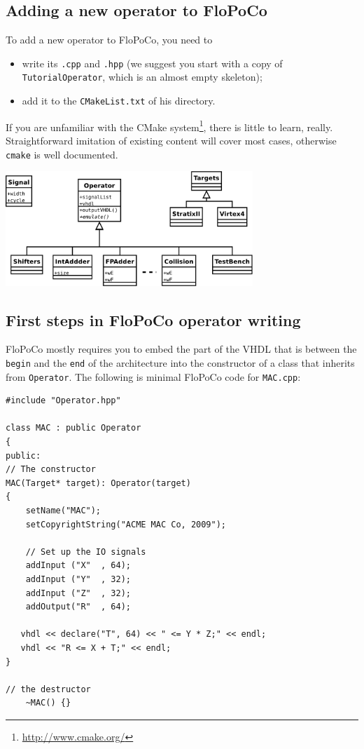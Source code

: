 \documentclass{article}
\begin{document}
\subsection{Adding a new operator to FloPoCo}
To add a new operator to FloPoCo, you need to 
\begin{itemize}
\item write its \texttt{.cpp} and \texttt{.hpp} (we suggest you start with a copy of  \texttt{TutorialOperator}, which is an almost empty skeleton);
\item add it to the \texttt{CMakeList.txt} of his directory.
\end{itemize}
If you are unfamiliar with the CMake system\footnote{\url{http://www.cmake.org/}}, there is little to learn, really.
Straightforward imitation of existing content  will cover most cases, otherwise \texttt{cmake} is well documented.



\begin{center}
  \includegraphics[width=0.7\textwidth]{../Figures/FloPoCoClasses.pdf}        
\end{center}

\subsection{First steps in FloPoCo operator writing}

FloPoCo mostly requires you to embed the part of the VHDL that is between the \texttt{begin} and the \texttt{end} of the architecture
into the constructor of a class that inherits from
\verb!Operator!. The following is minimal FloPoCo code for
\verb!MAC.cpp!:
\begin{verbatim}
#include "Operator.hpp"

class MAC : public Operator
{
public:
// The constructor
MAC(Target* target): Operator(target)
{
	setName("MAC");
	setCopyrightString("ACME MAC Co, 2009");		

	// Set up the IO signals
	addInput ("X"  , 64);
	addInput ("Y"  , 32);
	addInput ("Z"  , 32);
	addOutput("R"  , 64);

   vhdl << declare("T", 64) << " <= Y * Z;" << endl;
   vhdl << "R <= X + T;" << endl;
}

// the destructor
	~MAC() {}
\end{verbatim}
 
\end{document}
